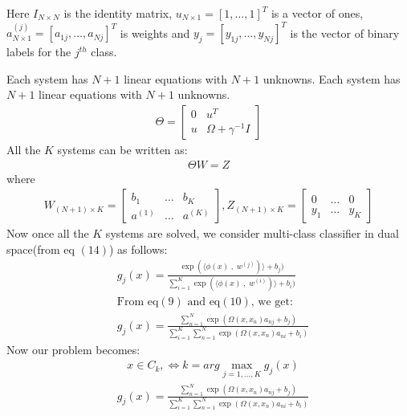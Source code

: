 \documentclass[conference]{IEEEtran}
\begin{document}
    Here $I_{N \times N}$ is the identity matrix, $u_{N \times 1} = [1,\ldots,1]^{T}$ is a vector of ones,
    $a^{(j)}_{N \times 1} = [a_{1j}, \ldots, a_{Nj}]^{T}$ is weights and $y_{j} = [y_{1j}, \ldots, y_{Nj}]^{T}$ is the
    vector of binary labels for the $j^{th}$ class.

    Each system has $N+1$ linear equations with $N+1$ unknowns.
    Each system has $N+1$ linear equations with $N+1$
    unknowns.
    \begin{align}
        \Theta = \begin{bmatrix}
                     0 & u^{T}                 \\
                     u & \Omega + \gamma^{-1}I
        \end{bmatrix}
    \end{align}
    All the $K$ systems can be written as:
    \begin{align}
        \Theta W = Z
    \end{align}
    where
    \begin{align*}
        W_{(N+1) \times K} = \begin{bmatrix}
                                 b_{1}   & \ldots & b_{K}   \\
                                 a^{(1)} & \ldots & a^{(K)}
        \end{bmatrix}
        , Z_{(N+1) \times K} = \begin{bmatrix}
                                   0     & \ldots & 0     \\
                                   y_{1} & \ldots & y_{K}
        \end{bmatrix}
    \end{align*}
    Now once all the $K$ systems are solved, we consider multi-class classifier in dual space(from eq $(14)$) as follows:
    \begin{align*}
        &g_{j}(x) = \frac{\exp(\langle \phi(x)\;,\; w^{(j)})\rangle + b_{j})}{\sum_{i=1}^{K} \exp(\langle \phi(x)\;,\; w^{(i)})\rangle + b_{i})}\\
        &\text{From eq$(9)$ and eq$(10)$, we get:} \\
        &g_{j}(x) = \frac{\sum_{n=1}^{N}\exp(\Omega(x,x_{n})a_{nj} + b_{j})}{\sum_{i=1}^{K} \sum_{n=1}^{N}\exp(\Omega(x,x_{n})a_{ni} + b_{i})}
    \end{align*}
    Now our problem becomes:
    \begin{align}
        & x \in C_{k}, \Leftrightarrow k= arg \max_{j=1,\ldots,K} g_{j}(x)
    \end{align}
    \begin{align*}
        & g_{j}(x) = \frac{\sum_{n=1}^{N}\exp(\Omega(x,x_{n})a_{nj} + b_{j})}{\sum_{i=1}^{K} \sum_{n=1}^{N}\exp(\Omega(x,x_{n})a_{ni} + b_{i})}
    \end{align*}
\end{document}
